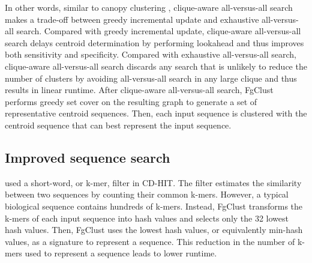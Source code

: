 \documentclass[11pt,letterpaper]{llncs2e/llncs}
\begin{document}
In other words, similar to canopy clustering \citep{mccallum2000efficient}, clique-aware all-versus-all search makes a trade-off between greedy incremental update and exhaustive all-versus-all search. 
Compared with greedy incremental update, clique-aware all-versus-all search delays centroid determination by performing lookahead and thus improves both sensitivity and specificity.
Compared with exhaustive all-versus-all search, clique-aware all-versus-all search discards any search that is unlikely to reduce the number of clusters by avoiding all-versus-all search in any large clique and thus results in linear runtime.
After clique-aware all-versus-all search, FgClust performs greedy set cover on the resulting graph to generate a set of representative centroid sequences.
Then, each input sequence is clustered with the centroid sequence that can best represent the input sequence.

\subsection{Improved sequence search}
\label{subsec:seqsearch}

 used a short-word, or k-mer, filter in CD-HIT.
The filter estimates the similarity between two sequences by counting their common k-mers.
However, a typical biological sequence contains hundreds of k-mers.
Instead, FgClust transforms the k-mers of each input sequence into hash values and selects only the 32 lowest hash values.
Then, FgClust uses the lowest hash values, or equivalently min-hash values, as a signature to represent a sequence.
This reduction in the number of k-mers used to represent a sequence leads to lower runtime.
\label{para:min-hash}
\end{document}
